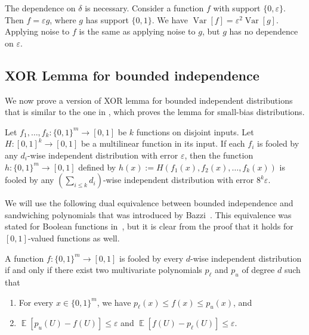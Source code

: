 \documentclass{toc}
\newcommand{\zo}{\{0,1\}}
\def\eps{\varepsilon}
\DeclareMathOperator*{\E}{\mathbb{E}}                 %
\DeclareMathOperator*{\Var}{Var}                 %
\begin{document}
  \begin{remark}
    The dependence on $\delta$ is necessary.
    Consider a function $f$ with support $\{0, \eps\}$.
    Then $f = \eps g$, where $g$ has support $\zo$.  
    We have $\Var[f] = \eps^2 \Var[g]$.  
    Applying noise to $f$ is the same as applying noise to $g$, but $g$ has no dependence on $\eps$.
  \end{remark}

  \subsection{XOR Lemma for bounded independence}
  We now prove a version of XOR lemma for bounded independent distributions that is similar to the one in \cite{GopalanMRTV12}, which proves the lemma for small-bias distributions.
  \begin{lemma} \label{lemma:xor}
    Let $f_1, \ldots, f_k\colon \zo^m \to [0,1]$ be $k$ functions on disjoint inputs.
    Let $H\colon [0,1]^k \to [0,1]$ be a multilinear function in its input.
    If each $f_i$ is fooled by any $d_i$-wise independent distribution with error $\eps$,
    then the function $h\colon \zo^m \to [0,1]$ defined by $h(x) := H(f_1(x), f_2(x), \ldots, f_k(x))$ is fooled by any $(\sum_{i \le k} d_i)$-wise independent distribution with error $8^k \eps$.
  \end{lemma}

  We will use the following dual equivalence between bounded independence and sandwiching polynomials that was introduced by Bazzi~\cite{Bazzi09}.
  This equivalence was stated for Boolean functions in~\cite{Bazzi09}, but it is clear from the proof that it holds for $[0,1]$-valued functions as well.

  \begin{fact} \label{fact:sandwiching-poly}
    A function $f\colon \zo^m \to [0,1]$ is fooled by every $d$-wise independent distribution if and only if there exist two multivariate polynomials $p_\ell$ and $p_u$ of degree $d$ such that
    \begin{enumerate}
      \item For every $x \in \zo^m$, we have $p_\ell(x) \le f(x) \le p_u(x)$, and
      \item $\E[ p_u(U) - f(U) ] \le \eps$ and $\E[ f(U) - p_\ell(U)] \le \eps$.
    \end{enumerate}
  \end{fact}
\end{document}
